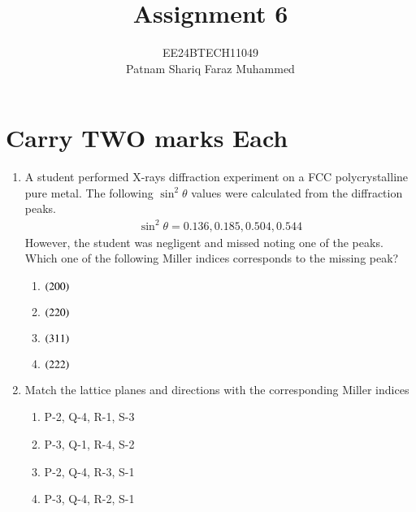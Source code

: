 \documentclass[journal]{IEEEtran}
\numberwithin{equation}{enumi}
\numberwithin{figure}{enumi}
\begin{document}


\title{Assignment 6}
\author{EE24BTECH11049 \\ Patnam Shariq Faraz Muhammed}

{\let\newpage\relax\maketitle}
\section{Carry TWO marks Each}
\begin{enumerate}
	\item A student performed X-rays diffraction experiment on a FCC polycrystalline pure metal. The following $\sin^{2}{\theta}$ values were calculated from the diffraction peaks. 
		\begin{align*}
			\sin^{2}{\theta} = 0.136, 0.185, 0.504, 0.544
		\end{align*}
	However, the student was negligent and missed noting one of the peaks. Which one of the following Miller indices corresponds to the missing peak? 
		
		\hfill{}

		\begin{multicols}{4}
			\begin{enumerate}
				\item $\left(200\right)$
				\item $\left(220\right)$
				\item $\left(311\right)$
				\item $\left(222\right)$
			\end{enumerate}
		\end{multicols}

	\item Match the lattice planes and directions  with the corresponding Miller indices 

		\begin{table}[H]
			\centering
			
		\end{table}
		\hfill{}

		\begin{enumerate}
			\item P-2, Q-4, R-1, S-3 
			\item P-3, Q-1, R-4, S-2
			\item P-2, Q-4, R-3, S-1
			\item P-3, Q-4, R-2, S-1
		\end{enumerate}


\end{enumerate}
\end{document}
